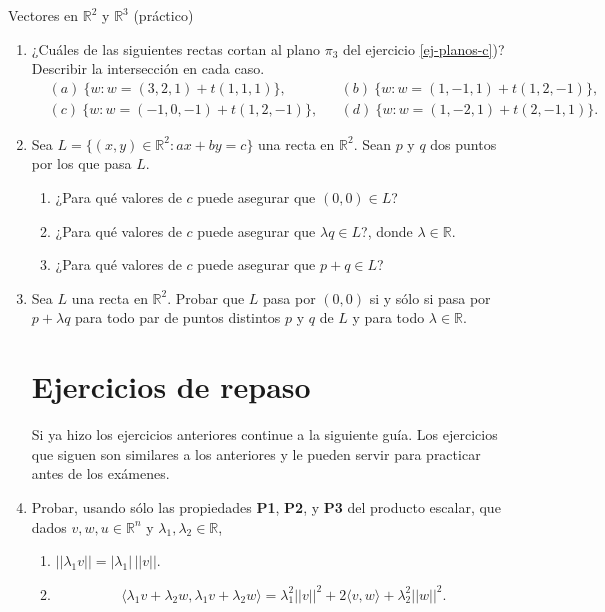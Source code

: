 \begin{chapter}{Vectores en $\mathbb R^2$ y $\mathbb R^3$ (práctico)}
\begin{enumerate}
\item ¿Cu\'ales de las siguientes rectas cortan al plano $\pi_3$ del  ejercicio \ref{ej-planos-c})?
Describir la intersecci{\'o}n en cada caso.
\begin{align*}
&(a) \ \{w: w=(3,2,1)+t(1,1,1)\}, && (b) \  \{w: w=(1,-1,1)+t(1,2,-1)\}, \\
&(c)\  \{w: w=(-1,0,-1)+t(1,2,-1)\}, && (d) \  \{w: w=(1,-2,1)+t(2,-1,1)\}.
\end{align*}


\item Sea $L=\{(x,y)\in\mathbb{R}^2 : ax+by=c\}$ una recta en $\mathbb{R}^2$. Sean $p$ y $q$ dos puntos por los que pasa $L$.
\begin{enumerate}
 \item ¿Para qu\'e valores de $c$ puede asegurar que $(0,0)\in L$?
 \item ¿Para qu\'e valores de $c$ puede asegurar que $\lambda q\in L$?, donde $\lambda\in\mathbb{R}$.
 \item ¿Para qu\'e valores de $c$ puede asegurar que $p+q\in L$?
\end{enumerate}


\item\label{p1-rectas} Sea $L$ una recta en $\mathbb{R}^2$. Probar que $L$ pasa por $(0,0)$ si y s\'olo si pasa por $p+\lambda q$ para todo par de puntos distintos $p$ y $q$ de $L$ y para todo $\lambda\in\mathbb{R}$.


\section*{Ejercicios de repaso}

 Si ya hizo los ejercicios anteriores continue a la siguiente gu\'ia. Los ejercicios que siguen son similares a los anteriores y le pueden servir para practicar antes de los ex\'amenes.
\item Probar, usando sólo las propiedades \textbf{P1}, \textbf{P2}, y \textbf{P3} del producto escalar, que dados $v, w, u \in \mathbb R^n$ y $\lambda_1, \lambda_2 \in \mathbb R$, 
\begin{enumerate}	
	\item $||\lambda_1 v|| = |\lambda_1|\, ||v||$.
	\item  
	\begin{equation*}
	\langle \lambda_1 v + \lambda_2 w ,  \lambda_1 v + \lambda_2 w   \rangle =
	\lambda_1^2 || v||^2 + 2  \langle v,w  \rangle + \lambda_2^2 ||w||^2 .
	\end{equation*}
\end{enumerate}



\end{enumerate}
\end{chapter}

